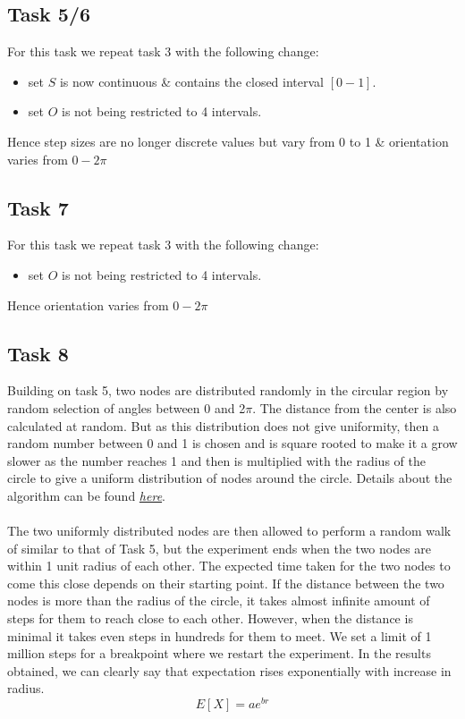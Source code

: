 \documentclass[answers]{exam}
\begin{document}
\subsection {Task 5/6}
\begin{solution}
    For this task we repeat task 3 with the following change:
    \begin{itemize}
        \item set $S$ is now continuous \& contains the closed interval $[0-1]$.
        \item set $O$ is not being restricted to 4 intervals.
    \end{itemize}
     Hence step sizes are no longer discrete values but vary from 0 to 1 \& orientation varies from $0-2\pi$
\end{solution}

\subsection {Task 7}
\begin{solution}
    For this task we repeat task 3 with the following change:
    \begin{itemize}
        \item set $O$ is not being restricted to 4 intervals.
    \end{itemize}
     Hence orientation varies from $0-2\pi$
\end{solution}

\subsection {Task 8}
\begin{solution}
    Building on task 5, two nodes are distributed randomly in the circular region by random selection of angles between 0 and 2$\pi$. The distance from the center is also calculated at random. But as this distribution does not give uniformity, then a random number between 0 and 1 is chosen and is square rooted to make it a grow slower as the number reaches 1 and then is multiplied with the radius of the circle to give a uniform distribution of nodes around the circle. Details about the algorithm can be found \href{https://blogs.sas.com/content/iml/2016/03/30/generate-uniform-2d-ball.html}{\emph{here}}.\\\\
    The two uniformly distributed nodes are then allowed to perform a random walk of similar to that of Task 5, but the experiment ends when the two nodes are within 1 unit radius of each other. The expected time taken for the two nodes to come this close depends on their starting point. If the distance between the two nodes is more than the radius of the circle, it takes almost infinite amount of steps for them to reach close to each other. However, when the distance is minimal it takes even steps in hundreds for them to meet. We set a limit of 1 million steps for a breakpoint where we restart the experiment. In the results obtained, we can clearly say that expectation rises exponentially with increase in radius.
    \[E[X] = ae^{br} \]
\end{solution}
\end{document}
